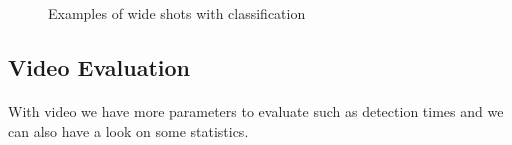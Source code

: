 \documentclass[english]{article}
\begin{document}
\begin{figure}[H]
            \vspace{1em}

            \hfill
            \hfill

            \vspace{1em}


            \caption{Examples of wide shots with classification}
        \end{figure}


	\subsection{Video Evaluation}
		\paragraph{}
			With video we have more parameters to evaluate such as detection times and we can also
			have a look on some statistics.
\end{document}
